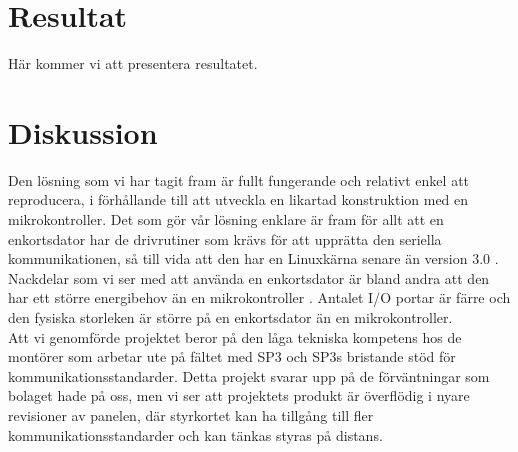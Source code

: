 \documentclass{article}
\begin{document}

    \section{Resultat} %
    \label{sec:resultat}
        Här kommer vi att presentera resultatet. \\

    \section{Diskussion} %
    \label{sec:diskussion}


        Den lösning som vi har tagit fram är fullt fungerande och relativt enkel att reproducera, i förhållande till att utveckla en likartad konstruktion med en mikrokontroller. Det som gör vår lösning enklare är fram för allt att en enkortsdator har de drivrutiner som krävs för att upprätta den seriella kommunikationen, så till vida att den har en Linuxkärna senare än version 3.0 \cite{silicon}. \\


        \noindent Nackdelar som vi ser med att använda en enkortsdator är bland andra att den har ett större energibehov än en mikrokontroller \cite{gadgetBlog, rasp}. Antalet I/O portar är färre och den fysiska storleken är större på en enkortsdator än en mikrokontroller.\\

        \noindent Att vi genomförde projektet beror på den låga tekniska kompetens hos de montörer som arbetar ute på fältet med SP3 och SP3s bristande stöd för kommunikationsstandarder. Detta projekt svarar upp på de förväntningar som bolaget hade på oss, men vi ser att projektets produkt är överflödig i nyare revisioner av panelen, där styrkortet kan ha tillgång till fler kommunikationsstandarder och kan tänkas styras på distans.


    \clearpage
    \printbibliography      
\end{document}
